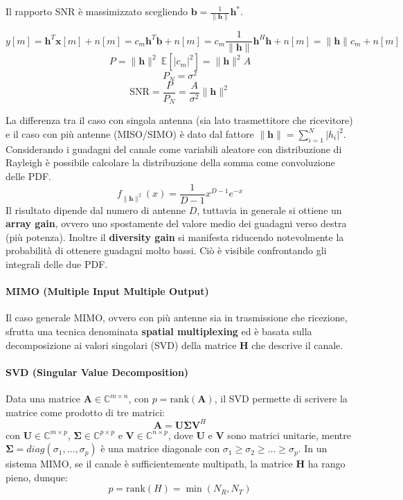 Il rapporto SNR è massimizzato scegliendo $\mathbf{b} = \frac{1}{\| \mathbf{h} \|} \mathbf{h}^*$.

\[
    y[m] = \mathbf{h}^T \mathbf{x}[m] + n[m] = c_m \mathbf{h}^T \mathbf{b} + n[m] = c_m \frac{1}{\|\mathbf{h}\|} \mathbf{h}^H \mathbf{h} + n[m] = \| \mathbf{h} \| c_m + n[m]
\]
\[
    P = \|\mathbf{h} \|^2 \ \mathbb{E} \left[\left| c_m \right|^2 \right] = \|\mathbf{h} \|^2  A
\]
\[
    P_N = \sigma^2  
\]
\[
    \text{SNR} = \frac{P}{P_N} = \frac{A}{\sigma^2} \|\mathbf{h}\|^2 
\]

La differenza tra il caso con singola antenna (sia lato trasmettitore che ricevitore) e il caso con più antenne (MISO/SIMO) è dato dal fattore $\| \mathbf{h} \| = \sum_{i=1}^{N} |h_i|^2$.
Considerando i guadagni del canale come variabili aleatore con distribuzione di Rayleigh è possibile calcolare la distribuzione della somma come convoluzione delle PDF.
\[
    f_{\| \mathbf{h} \|^2} (x) = \frac{1}{D-1} x^{D-1} e^{-x}
\]
Il risultato dipende dal numero di antenne $D$, tuttavia in generale si ottiene un \textbf{array gain}, ovvero uno spostamente del valore medio dei guadagni verso destra (più potenza).
Inoltre il \textbf{diversity gain} si manifesta riducendo notevolmente la probabilità di ottenere guadagni molto bassi.
Ciò è visibile confrontando gli integrali delle due PDF.

\paragraph*{MIMO (Multiple Input Multiple Output)}

Il caso generale MIMO, ovvero con più antenne sia in trasmissione che ricezione, sfrutta una tecnica denominata \textbf{spatial multiplexing} ed è basata sulla decomposizione ai valori singolari (SVD) della matrice $\mathbf{H}$ che descrive il canale.

\paragraph*{SVD (Singular Value Decomposition)}

Data una matrice $\mathbf{A} \in \mathbb{C}^{m \times n}$, con  $p = \text{rank} (\mathbf{A})$, il SVD permette di scrivere la matrice come prodotto di tre matrici:
\[
    \mathbf{A} = \mathbf{U} \mathbf{\Sigma} \mathbf{V}^H
\]
con $\mathbf{U} \in \mathbb{C}^{m \times p}$, $\mathbf{\Sigma} \in \mathbb{C}^{p \times p}$ e $\mathbf{V} \in \mathbb{C}^{n \times p}$,
dove $\mathbf{U}$ e $\mathbf{V}$ sono matrici unitarie, mentre $\mathbf{\Sigma} = diag(\sigma_1, \ldots, \sigma_p)$ è una matrice diagonale con $\sigma_1 \geq \sigma_2 \geq \ldots \geq \sigma_p$. In un sistema MIMO, se il canale è sufficientemente multipath, la matrice $\mathbf{H}$ ha rango pieno, dunque:
\[
    p = \text{rank}(H) = \min(N_R, N_T)
\]

